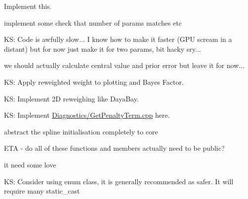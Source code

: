 \begin{DoxyRefList}
\label{todo__todo000026}%
%


\label{todo__todo000025}%
%
Implement this.  
\item[Member \mbox{\hyperlink{classmcmc_adf4c80255288c5396da3b95d609ce4b2}{mcmc\+::Start\+From\+Previous\+Fit}} (const std\+::string \&Fit\+Name) override]\label{todo__todo000009}%
%
implement some check that number of params matches etc  
\item[Member \mbox{\hyperlink{classMCMCProcessor_aef760d8c4bb70690a5c4114f4b2409b3}{MCMCProcessor\+::Power\+Spectrum\+Analysis}} ()]\label{todo__todo000011}%
%
KS\+: Code is awfully slow... I know how to make it faster (GPU scream in a distant) but for now just make it for two params, bit hacky sry...  
\item[Member \mbox{\hyperlink{classMCMCProcessor_a3733b3b753c73f79e6846bc92c4da11b}{MCMCProcessor\+::Read\+OSCFile}} ()]\label{todo__todo000010}%
%
we should actually calculate central value and prior error but leave it for now...  
\item[Member \mbox{\hyperlink{MCMCProcessor_8h_acd2848273413543fe14936252942c20b}{Parameter\+Enum}} ]\label{todo__todo000012}%
%
KS\+: Apply reweighted weight to plotting and Bayes Factor. 



KS\+: Implement 2D reweighing like Daya\+Bay. 



KS\+: Implement \mbox{\hyperlink{GetPenaltyTerm_8cpp}{Diagnostics/\+Get\+Penalty\+Term.\+cpp}} here.  
\item[Member \mbox{\hyperlink{classsamplePDFFDBase_a4f9fdda921406906cf11421f0c0b6416}{sample\+PDFFDBase\+::Setup\+Splines}} ()=0]\label{todo__todo000004}%
%
abstract the spline initialisation completely to core  
\item[Member \mbox{\hyperlink{classsplineFDBase_a089883fce1a3f4180e3156215fb9c38a}{spline\+FDBase\+::spline\+FDBase}} (\mbox{\hyperlink{classcovarianceXsec}{covariance\+Xsec}} $\ast$xsec\+\_\+=NULL)]\label{todo__todo000002}%
%
ETA -\/ do all of these functions and members actually need to be public?  
\item[Member \mbox{\hyperlink{classsplineFDBase_a16c33124874a336255a3cba480b835c2}{spline\+FDBase\+::$\sim$spline\+FDBase}} ()]\label{todo__todo000003}%
%
it need some love  
\item[Member \mbox{\hyperlink{Structs_8h_affc27d8b7b82d3713f45af17873fde2f}{Syst\+Type}} ]\label{todo__todo000005}%
%
KS\+: Consider using enum class, it is generally recommended as safer. It will require many static\+\_\+cast 
\end{DoxyRefList}